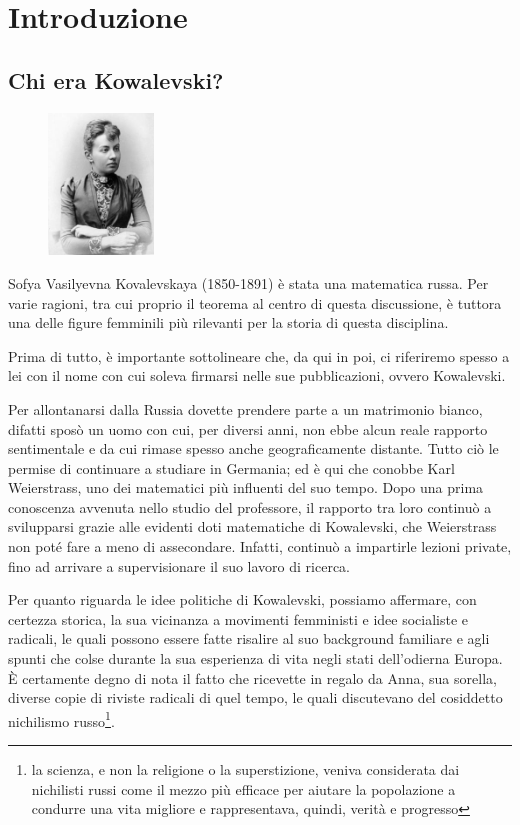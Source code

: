 \chapter{Introduzione}

\section{Chi era Kowalevski?}
\begin{figure}
    \centering
    \includegraphics[width=0.25\textwidth]{kovalevskaya_8}
\end{figure}

Sofya Vasilyevna Kovalevskaya (1850-1891) è stata una matematica russa. Per varie ragioni, tra cui proprio il teorema al centro di questa discussione, è tuttora una delle figure femminili più rilevanti per la storia di questa disciplina.

Prima di tutto, è importante sottolineare che, da qui in poi, ci riferiremo spesso a lei con il nome con cui soleva firmarsi nelle sue pubblicazioni, ovvero Kowalevski.

Per allontanarsi dalla Russia dovette prendere parte a un matrimonio bianco, difatti sposò un uomo con cui, per diversi anni, non ebbe alcun reale rapporto sentimentale e da cui rimase spesso anche geograficamente distante.
Tutto ciò le permise di continuare a studiare in Germania; ed è qui che conobbe Karl Weierstrass, uno dei matematici più influenti del suo tempo.
Dopo una prima conoscenza avvenuta nello studio del professore, il rapporto tra loro continuò a svilupparsi grazie alle evidenti doti matematiche di Kowalevski, che Weierstrass non poté fare a meno di assecondare. Infatti, continuò a impartirle lezioni private, fino ad arrivare a supervisionare il suo lavoro di ricerca.

Per quanto riguarda le idee politiche di Kowalevski, possiamo affermare, con certezza storica, la sua vicinanza a movimenti femministi e idee socialiste e radicali, le quali possono essere fatte risalire al suo background familiare e agli spunti che colse durante la sua esperienza di vita negli stati dell'odierna Europa. È certamente degno di nota il fatto che ricevette in regalo da Anna, sua sorella, diverse copie di riviste radicali di quel tempo, le quali discutevano del cosiddetto nichilismo russo\footnote{la scienza, e non la religione o la superstizione, veniva considerata dai nichilisti russi come il mezzo più efficace per aiutare la popolazione a condurre una vita migliore e rappresentava, quindi, verità e progresso}.

